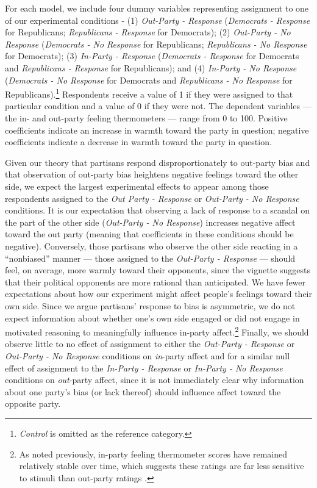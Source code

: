 \documentclass[12pt, letterpaper]{article}
\begin{document}
For each model, we include four dummy variables representing assignment to one of our experimental conditions - (1) \textit{Out-Party - Response} (\textit{Democrats - Response} for Republicans; \textit{Republicans - Response} for Democrats); (2) \textit{Out-Party - No Response} (\textit{Democrats - No Response} for Republicans; \textit{Republicans - No Response} for Democrats); (3) \textit{In-Party - Response} (\textit{Democrats - Response} for Democrats and \textit{Republicans - Response} for Republicans); and (4) \textit{In-Party - No Response} (\textit{Democrats - No Response} for Democrats and \textit{Republicans - No Response} for Republicans).\footnote{\textit{Control} is omitted as the reference category.} Respondents receive a value of 1 if they were assigned to that particular condition and a value of 0 if they were not. The dependent variables --- the in- and out-party feeling thermometers --- range from 0 to 100. Positive coefficients indicate an increase in warmth toward the party in question; negative coefficients indicate a decrease in warmth toward the party in question.

Given our theory that partisans respond disproportionately to out-party bias and that observation of out-party bias heightens negative feelings toward the other side, we expect the largest experimental effects to appear among those respondents assigned to the \textit{Out Party - Response} or \textit{Out-Party - No Response} conditions. It is our expectation that observing a lack of response to a scandal on the part of the other side (\textit{Out-Party - No Response}) increases negative affect toward the out party (meaning that coefficients in these conditions should be negative). Conversely, those partisans who observe the other side reacting in a ``nonbiased'' manner --- those assigned to the \textit{Out-Party - Response} --- should feel, on average, more warmly toward their opponents, since the vignette suggests that their political opponents are more rational than anticipated. We have fewer expectations about how our experiment might affect people's feelings toward their own side. Since we argue partisans' response to bias is asymmetric, we do not expect information about whether one's own side engaged or did not engage in motivated reasoning to meaningfully influence in-party affect.\footnote{As noted previously, in-party feeling thermometer scores have remained relatively stable over time, which suggests these ratings are far less sensitive to stimuli than out-party ratings \citep{haidthetherington_2012, IyengarSoodLelkes2012}.} Finally, we should observe little to no effect of assignment to either the \textit{Out-Party - Response} or \textit{Out-Party - No Response} conditions on \textit{in}-party affect and for a similar null effect of assignment to the \textit{In-Party - Response} or \textit{In-Party - No Response} conditions on \textit{out}-party affect, since it is not immediately clear why information about one party's bias (or lack thereof) should influence affect toward the opposite party. 
\end{document}
